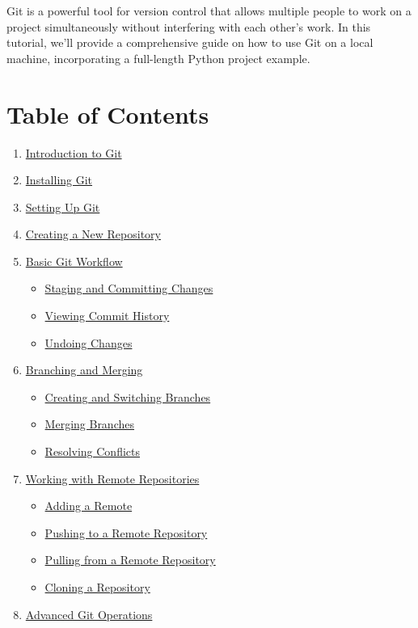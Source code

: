 \documentclass[
  letterpaper,
  DIV=11,
  numbers=noendperiod]{scrreprt}
\providecommand{\tightlist}{%
  \setlength{\itemsep}{0pt}\setlength{\parskip}{0pt}}\usepackage{longtable,booktabs,array}
\begin{document}
Git is a powerful tool for version control that allows multiple people
to work on a project simultaneously without interfering with each
other's work. In this tutorial, we'll provide a comprehensive guide on
how to use Git on a local machine, incorporating a full-length Python
project example.

\section{Table of Contents}\label{table-of-contents-25}

\begin{enumerate}
\def\labelenumi{\arabic{enumi}.}
\tightlist
\item
  \hyperref[introduction-to-git]{Introduction to Git}
\item
  \hyperref[installing-git]{Installing Git}
\item
  \hyperref[setting-up-git]{Setting Up Git}
\item
  \hyperref[creating-a-new-repository]{Creating a New Repository}
\item
  \hyperref[basic-git-workflow]{Basic Git Workflow}

  \begin{itemize}
  \tightlist
  \item
    \hyperref[staging-and-committing-changes]{Staging and Committing
    Changes}
  \item
    \hyperref[viewing-commit-history]{Viewing Commit History}
  \item
    \hyperref[undoing-changes]{Undoing Changes}
  \end{itemize}
\item
  \hyperref[branching-and-merging]{Branching and Merging}

  \begin{itemize}
  \tightlist
  \item
    \hyperref[creating-and-switching-branches]{Creating and Switching
    Branches}
  \item
    \hyperref[merging-branches]{Merging Branches}
  \item
    \hyperref[resolving-conflicts]{Resolving Conflicts}
  \end{itemize}
\item
  \hyperref[working-with-remote-repositories]{Working with Remote
  Repositories}

  \begin{itemize}
  \tightlist
  \item
    \hyperref[adding-a-remote]{Adding a Remote}
  \item
    \hyperref[pushing-to-a-remote-repository]{Pushing to a Remote
    Repository}
  \item
    \hyperref[pulling-from-a-remote-repository]{Pulling from a Remote
    Repository}
  \item
    \hyperref[cloning-a-repository]{Cloning a Repository}
  \end{itemize}
\item
  \hyperref[advanced-git-operations]{Advanced Git Operations}


\end{enumerate}
\end{document}
